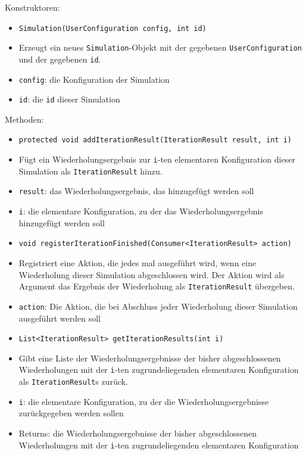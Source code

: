 \documentclass[parskip=full,11pt]{scrartcl}
\begin{document}
Konstruktoren:
\begin{itemize} \itemsep -10pt
\item \texttt{Simulation(UserConfiguration config, int id)}
\item[] Erzeugt ein neues \texttt{Simulation}-Objekt mit der gegebenen \texttt{UserConfiguration} und der gegebenen \texttt{id}.
\item[] \texttt{config}: die Konfiguration der Simulation
\item[] \texttt{id}: die \texttt{id} dieser Simulation
\end{itemize}

Methoden:
\begin{itemize}\itemsep -10pt
\item \texttt{protected void addIterationResult(IterationResult result, int i)}
\item[] Fügt ein Wiederholungsergebnis zur \texttt{i}-ten elementaren Konfiguration dieser Simulation als \texttt{IterationResult} hinzu.
\item[] \texttt{result}: das Wiederholungsergebnis, das hinzugefügt werden soll
\item[] \texttt{i}: die elementare Konfiguration, zu der das Wiederholungsergebnis hinzugefügt werden soll

\item \texttt{void registerIterationFinished(Consumer<IterationResult> action)}
\item[] Registriert eine Aktion, die jedes mal ausgeführt wird, wenn eine Wiederholung dieser Simulation abgeschlossen wird. Der Aktion wird als Argument das Ergebnis der Wiederholung als \texttt{IterationResult} übergeben.
\item[] \texttt{action}: Die Aktion, die bei Abschluss jeder Wiederholung dieser Simulation ausgeführt werden soll

\item \texttt{List<IterationResult> getIterationResults(int i)}
\item[] Gibt eine Liste der Wiederholungsergebnisse der bisher abgeschlossenen Wiederholungen mit der \texttt{i}-ten zugrundeliegenden elementaren Konfiguration als \texttt{IterationResult}s zurück.
\item[] \texttt{i}: die elementare Konfiguration, zu der die Wiederholungsergebnisse zurückgegeben werden sollen
\item[] Returns: die Wiederholungsergebnisse der bisher abgeschlossenen Wiederholungen mit der \texttt{i}-ten zugrundeliegenden elementaren Konfiguration


\end{itemize}
\end{document}
